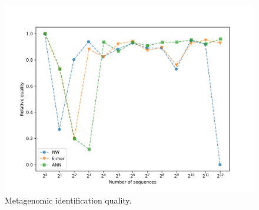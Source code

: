 \documentclass[pdflatex,sn-vancouver-num]{sn-jnl}%
\begin{document}
                \begin{figure}[!htb]
                    \begin{center}
                        \includegraphics[width=\textwidth]{picture_experiment_quality.png}
                    \end{center}
                    \caption{
                        Metagenomic identification quality.
                    }\label{Picture:Experiment:Quality}
                \end{figure}
\end{document}
